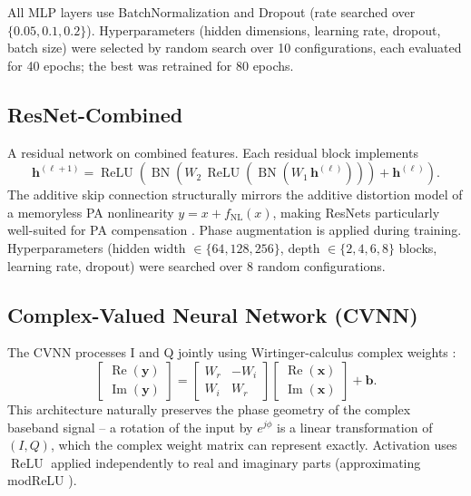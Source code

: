 \documentclass[journal]{IEEEtran}
\begin{document}
All MLP layers use BatchNormalization and Dropout (rate searched over
$\{0.05, 0.1, 0.2\}$). Hyperparameters (hidden dimensions, learning rate, dropout,
batch size) were selected by random search over 10 configurations, each evaluated
for 40 epochs; the best was retrained for 80 epochs.

\subsection{ResNet-Combined}

A residual network \cite{he2016deep} on combined features. Each residual block
implements
\begin{equation}
  \mathbf{h}^{(\ell+1)} = \operatorname{ReLU}\!\left(
      \operatorname{BN}(W_2\,\operatorname{ReLU}(\operatorname{BN}(W_1\,\mathbf{h}^{(\ell)})))
      + \mathbf{h}^{(\ell)}\right).
\end{equation}
The additive skip connection structurally mirrors the additive distortion model of
a memoryless PA nonlinearity $y = x + f_\text{NL}(x)$, making ResNets particularly
well-suited for PA compensation \cite{pihlajasalo2023deep}. Phase augmentation is
applied during training. Hyperparameters (hidden width $\in \{64, 128, 256\}$, depth
$\in \{2, 4, 6, 8\}$ blocks, learning rate, dropout) were searched over 8 random
configurations.

\subsection{Complex-Valued Neural Network (CVNN)}

The CVNN processes I and Q jointly using Wirtinger-calculus complex weights
\cite{trabelsi2018deep}:
\begin{equation}
  \begin{bmatrix} \operatorname{Re}(\mathbf{y}) \\ \operatorname{Im}(\mathbf{y}) \end{bmatrix}
  =
  \begin{bmatrix} W_r & -W_i \\ W_i & W_r \end{bmatrix}
  \begin{bmatrix} \operatorname{Re}(\mathbf{x}) \\ \operatorname{Im}(\mathbf{x}) \end{bmatrix}
  + \mathbf{b}.
\end{equation}
This architecture naturally preserves the phase geometry of the complex baseband
signal -- a rotation of the input by $e^{j\phi}$ is a linear transformation of
$(I, Q)$, which the complex weight matrix can represent exactly. Activation uses
$\operatorname{ReLU}$ applied independently to real and imaginary parts
(approximating modReLU \cite{trabelsi2018deep}).
\end{document}
